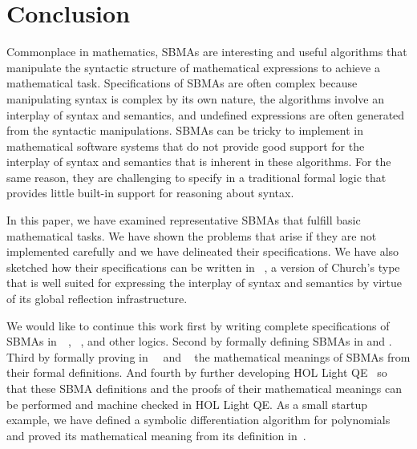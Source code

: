 \documentclass[fleqn]{llncs}
\begin{document}
\fi

\section{Conclusion}\label{sec:conclusion}

Commonplace in mathematics, SBMAs are interesting and useful
algorithms that manipulate the syntactic structure of mathematical
expressions to achieve a mathematical task.  Specifications of SBMAs
are often complex because manipulating syntax is complex by its own
nature, the algorithms involve an interplay of syntax and semantics,
and undefined expressions are often generated from the syntactic
manipulations.  SBMAs can be tricky to implement in mathematical
software systems that do not provide good support for the interplay of
syntax and semantics that is inherent in these algorithms.  For the
same reason, they are challenging to specify in a traditional formal
logic that provides little built-in support for reasoning about
syntax.

In this paper, we have examined representative SBMAs that fulfill
basic mathematical tasks.  We have shown the problems that arise if
they are not implemented carefully and we have delineated their
specifications.  We have also sketched how their specifications can be
written in {\churchuqe}~\cite{Farmer17}, a version of Church's type
that is well suited for expressing the interplay of syntax and
semantics by virtue of its global reflection infrastructure.

We would like to continue this work first by writing complete
specifications of SBMAs in~{\churchuqe}~\cite{Farmer17},
{\churchqe}~\cite{Farmer18}, and other logics.  Second by formally
defining SBMAs in {\churchuqe} and {\churchqe}.  Third by formally
proving in~{\churchuqe}~\cite{Farmer17} and
{\churchqe}~\cite{Farmer18} the mathematical meanings of SBMAs from
their formal definitions.  And fourth by further developing HOL Light
QE~\cite{CaretteFarmerLaskowski18} so that these SBMA definitions and
the proofs of their mathematical meanings can be performed and machine
checked in HOL Light QE.  As a small startup example, we have defined
a symbolic differentiation algorithm for polynomials and proved its
mathematical meaning from its definition in~\cite[subsections 4.4 and
  9.3]{Farmer18}.




\setcounter{tocdepth}{1}
\setcounter{tocdepth}{0}
\end{document}
